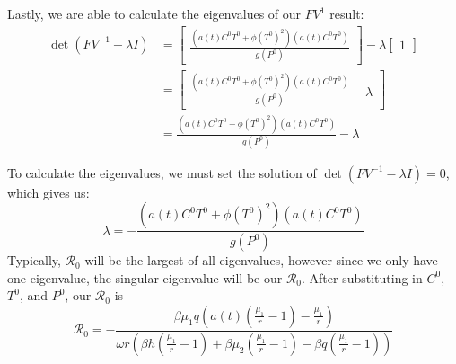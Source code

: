 \documentclass[12pt]{article}
\begin{document}
        Lastly, we are able to calculate the eigenvalues of our $FV^{1}$ result:
        \begin{align*}
            \det(FV^{-1} - \lambda I) &= \begin{bmatrix}
                                            \frac{(a(t)C^{0}T^{0}+\phi (T^{0})^{2})(a(t)C^{0}T^{0})}{g(P^{0})}
                                        \end{bmatrix}
                                        - \lambda
                                        \begin{bmatrix}
                                            1 
                                        \end{bmatrix}
                                    \\
                                    &= \begin{bmatrix}
                                            \frac{(a(t)C^{0}T^{0}+\phi (T^{0})^{2})(a(t)C^{0}T^{0})}{g(P^{0})} - \lambda 
                                        \end{bmatrix}
                                    \\
                                    &= \frac{(a(t)C^{0}T^{0}+\phi (T^{0})^{2})(a(t)C^{0}T^{0})}{g(P^{0})} - \lambda
        \end{align*}
        
        To calculate the eigenvalues, we must set the solution of $\det(FV^{-1} - \lambda I) = 0$, which gives us:
        \begin{equation*}
            \lambda = -\frac{(a(t)C^{0}T^{0}+\phi (T^{0})^{2})(a(t)C^{0}T^{0})}{g(P^{0})}
        \end{equation*}
        Typically, $\mathscr{R}_{0}$ will be the largest of all eigenvalues, however since we only have one eigenvalue, the singular eigenvalue will be our $\mathscr{R}_{0}$. After substituting in $C^{0}$, $T^{0}$, and $P^{0}$, our $\mathscr{R}_{0}$ is
        \begin{equation*}
            \displaystyle {\mathscr{R}}_{0} = - \frac{\beta \mu_{1}q(a(t)(\frac{\mu_{1}}{r}-1)-\frac{\mu_{1}}{r})}{\omega r (\beta h (\frac{\mu_{1}}{r}-1) + \beta \mu_{2} (\frac{\mu_{1}}{r}-1) - \beta q(\frac{\mu_{1}}{r}-1))}
        \end{equation*}


    
\end{document}
